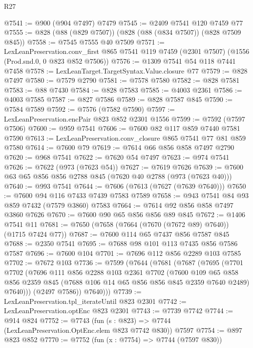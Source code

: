 \begin{lexlean}{R27}
\begin{coremodule}
@7541 := @900 (@904 @7497) @7479
@7545 := @2409 @7541 @120 @7459 @77
@7555 := @828 (@88 (@829 @7507)) (@828 (@88 (@834 @7507)) (@828 @7509 @845))
@7558 := @7545 @7555 @40 @7509
@7571 := LexLeanPreservation.conv_first
    @865
    @7541
    @119
    @7459
    (@2301 @7507)
    (@1556 (Prod.snd.{0, 0} @823 @852 @7506))
@7576 := @1309 @7541 @54 @118 @7441 @7458
@7578 := LexLeanTarget.TargetSyntax.Value.closure @77
@7579 := @828 @7497
@7580 := @7579 @2790
@7581 := @7578 @7580
@7582 := @828 @7581
@7583 := @88 @7430
@7584 := @828 @7583
@7585 := @4003 @2361
@7586 := @4003 @7585
@7587 := @827 @7586
@7589 := @828 @7587 @845
@7590 := @7584 @7589
@7592 := @7576 (@7582 @7590)
@7597 := LexLeanPreservation.encPair @823 @852 @2301 @1556
@7599 := @7592 (@7597 @7506)
@7600 := @959 @7541
@7606 := @7600 @82 @117 @859 @7440 @7581 @7590
@7613 := LexLeanPreservation.conv_closure @865 @7541 @77 @81 @859 @7580
@7614 := @7600 @79
@7619 := @7614 @66 @856 @858 @7497 @2790
@7620 := @968 @7541
@7622 := @7620 @54 @7497
@7623 := @974 @7541
@7626 := @7622 (@973 (@7623 @54))
@7627 := @7619 @7626
@7639 := @7600 @63 @65 @856 @856 @2788 @845 (@7620 @40 @2788 (@973 (@7623 @40)))
@7640 := @993 @7541
@7644 := @7606 (@7613 (@7627 (@7639 @7640)))
@7650 := @7600 @94 @116 @7433 @7439 @7583 @7589
@7658 := @943 @7541 @84 @93 @859 @7432 (@7579 @3860) @7583
@7664 := @7614 @92 @856 @858 @7497 @3860 @7626
@7670 := @7600 @90 @65 @856 @856 @89 @845
@7672 := @1406 @7541 @11
@7681 := @7650 (@7658 (@7664 (@7670 (@7672 @89) @7640)) (@1715 @7424 @77))
@7687 := @7600 @114 @65 @7437 @856 @7587 @845
@7688 := @2350 @7541
@7695 := @7688 @98 @101 @113 @7435 @856 @7586 @7587
@7696 := @7600 @104
@7701 := @7696 @112 @856 @2289 @103 @7585
@7702 := @7672 @103
@7736 := @7599
    (@7644
      (@7681
        (@7687
          (@7695
            (@7701
              @7702
              (@7696
                @111
                @856
                @2288
                @103
                @2361
                @7702
                (@7600
                  @109
                  @65
                  @858
                  @856
                  @2359
                  @845
                  (@7688 @106 @14 @65 @856 @856 @845 @2359 @7640 @2489)
                  @7640)))
            (@2497 @7586))
          @7640)))
@7739 := LexLeanPreservation.tpl_iterateUntil @823 @2301
@7742 := LexLeanPreservation.optEnc @823 @2301
@7743 := @7739 @7742
@7744 := @914 @824
@7752 := @7743 (fun (s : @823) => @7744 (LexLeanPreservation.OptEnc.elem @823 @7742 @830)) @7597
@7754 := @897 @823 @852
@7770 := @7752
    (fun (x : @7754) => @7744 (@7597 @830))

\end{coremodule}
\end{lexlean}
